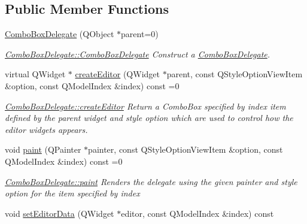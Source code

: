 \subsection*{Public Member Functions}
\begin{DoxyCompactItemize}
\item 
\hyperlink{classGui_1_1Widgets_1_1Delegates_1_1ComboBoxDelegate_a34105ef48d776c556598b9b15e7abdcc}{Combo\-Box\-Delegate} (Q\-Object $\ast$parent=0)
\begin{DoxyCompactList}\small\item\em \hyperlink{classGui_1_1Widgets_1_1Delegates_1_1ComboBoxDelegate_a34105ef48d776c556598b9b15e7abdcc}{Combo\-Box\-Delegate\-::\-Combo\-Box\-Delegate} Construct a \hyperlink{classGui_1_1Widgets_1_1Delegates_1_1ComboBoxDelegate}{Combo\-Box\-Delegate}. \end{DoxyCompactList}\item 
virtual Q\-Widget $\ast$ \hyperlink{classGui_1_1Widgets_1_1Delegates_1_1ComboBoxDelegate_aa24c5896e30295ad7dbe47c91093b2db}{create\-Editor} (Q\-Widget $\ast$parent, const Q\-Style\-Option\-View\-Item \&option, const Q\-Model\-Index \&index) const =0
\begin{DoxyCompactList}\small\item\em \hyperlink{classGui_1_1Widgets_1_1Delegates_1_1ComboBoxDelegate_aa24c5896e30295ad7dbe47c91093b2db}{Combo\-Box\-Delegate\-::create\-Editor} Return a Combo\-Box specified by {\itshape index} item defined by the {\itshape parent} widget and style {\itshape option} which are used to control how the editor widgets appears. \end{DoxyCompactList}\item 
void \hyperlink{classGui_1_1Widgets_1_1Delegates_1_1ComboBoxDelegate_a0b7f0752890cd3fb257361a7990a74c2}{paint} (Q\-Painter $\ast$painter, const Q\-Style\-Option\-View\-Item \&option, const Q\-Model\-Index \&index) const =0
\begin{DoxyCompactList}\small\item\em \hyperlink{classGui_1_1Widgets_1_1Delegates_1_1ComboBoxDelegate_a0b7f0752890cd3fb257361a7990a74c2}{Combo\-Box\-Delegate\-::paint} Renders the delegate using the given {\itshape painter} and style {\itshape option} for the item specified by {\itshape index} \end{DoxyCompactList}\item 
void \hyperlink{classGui_1_1Widgets_1_1Delegates_1_1ComboBoxDelegate_a30d218e265b7656e17fece8a73e53e90}{set\-Editor\-Data} (Q\-Widget $\ast$editor, const Q\-Model\-Index \&index) const 

\end{DoxyCompactItemize}
